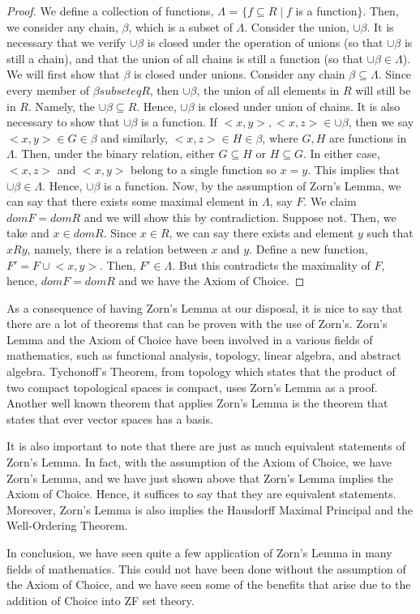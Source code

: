 \documentclass[12pt]{article}
\theoremstyle{definition}
\begin{document}
	\begin{proof}
	We define a collection of functions, $\Lambda$ = $\{f \subseteq R \mid f$ is a function$\}$. Then, we consider any chain, $\beta$, which is a subset of $\Lambda$. Consider the union, $\cup \beta$. It is necessary that we verify $\cup \beta$ is closed under the operation of unions (so that $\cup \beta$ is still a chain), and that the union of all chains is still a function (so that $\cup \beta \in \Lambda$). We will first show that $\beta$ is closed under unions. Consider any chain $\beta \subseteq \Lambda$. Since every member of $\beta subseteq R$, then $\cup \beta$, the union of all elements in $R$ will still be in $R$. Namely, the $\cup \beta \subseteq R$. Hence, $\cup \beta$ is closed under union of chains. It is also necessary to show that $\cup \beta$ is a function. If $<x,y> , <x,z> \in \cup \beta$, then we say $<x,y> \in G \in \beta$ and similarly, $<x,z> \in H \in \beta$, where $G, H$ are functions in $\Lambda$. Then, under the binary relation, either $G \subseteq H$ or $H \subseteq G$. In either case, $<x,z>$ and $<x,y>$ belong to a single function so $x = y$. This implies that $\cup \beta \in \Lambda$. Hence, $\cup \beta$ is a function. Now, by the assumption of Zorn's Lemma, we can say that there exists some maximal element in $\Lambda$, say $F$. We claim $dom F = dom R$ and we will show this by contradiction. Suppose not. Then, we take and $x \in dom R$. Since $x \in R$, we can say there exists and element $y$ such that $xRy$, namely, there is a relation between $x$ and $y$. Define a new function, $F' = F\cup{<x,y>}$. Then, $F' \in \Lambda$. But this contradicts the maximality of $F$, hence, $dom F = dom R$ and we have the Axiom of Choice.
	\end{proof}
	
	As a consequence of having Zorn's Lemma at our disposal, it is nice to say that there are a lot of theorems that can be proven with the use of Zorn's. Zorn's Lemma and the Axiom of Choice have been involved in a various fields of mathematics, such as functional analysis, topology, linear algebra, and abstract algebra. Tychonoff's Theorem, from topology which states that the product of two compact topological spaces is compact, uses Zorn's Lemma as a proof. Another well known theorem that applies Zorn's Lemma is the theorem that states that ever vector spaces has a basis.
	
	It is also important to note that there are just as much equivalent statements of Zorn's Lemma. In fact, with the assumption of the Axiom of Choice, we have Zorn's Lemma, and we have just shown above that Zorn's Lemma implies the Axiom of Choice. Hence, it suffices to say that they are equivalent statements. Moreover, Zorn's Lemma is also implies the Hausdorff Maximal Principal and the Well-Ordering Theorem.
	
	In conclusion, we have seen quite a few application of Zorn's Lemma in many fields of mathematics. This could not have been done without the assumption of the Axiom of Choice, and we have seen some of the benefits that arise due to the addition of Choice into ZF set theory.
	
	
	
	
\end{document}
